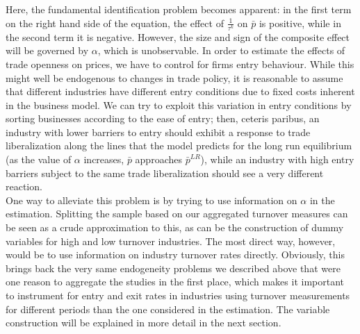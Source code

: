 Here, the fundamental identification problem becomes apparent: in the first term on the right hand side of the equation, the effect of $\frac{1}{\tau^k}$ on $\bar{p}$ is positive, while in the second term it is negative. However, the size and sign of the composite effect will be governed by $\alpha$, which is unobservable. In order to estimate the effects of trade openness on prices, we have to control for firms entry behaviour. While this might well be endogenous to changes in trade policy, it is reasonable to assume that different industries have different entry conditions due to fixed costs inherent in the business model. We can try to exploit this variation in entry conditions by sorting businesses according to the ease of entry; then, ceteris paribus, an industry with lower barriers to entry should exhibit a response to trade liberalization along the lines that the model predicts for the long run equilibrium (as the value of $\alpha$ increases, $\bar{p}$ approaches $\bar{p}^{LR}$), while an industry with high entry barriers subject to the same trade liberalization should see a very different reaction. \\
One way to alleviate this problem is by trying to use information on $\alpha$ in the estimation. Splitting the sample based on our aggregated turnover measures can be seen as a crude approximation to this, as can be the construction of dummy variables for high and low turnover industries. The most direct way, however, would be to use information on industry turnover rates directly. Obviously, this brings back the very same endogeneity problems we described above that were one reason to aggregate the studies in the first place, which makes it important to instrument for entry and exit rates in industries using turnover measurements for different periods than the one considered in the estimation. The variable construction will be explained in more detail in the next section.

